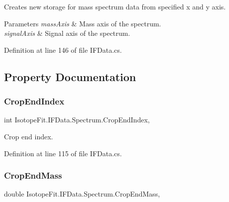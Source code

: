 Creates new storage for mass spectrum data from specified x and y axis. 


\begin{DoxyParams}{Parameters}
{\em mass\+Axis} & Mass axis of the spectrum.\\
\hline
{\em signal\+Axis} & Signal axis of the spectrum.\\
\hline
\end{DoxyParams}


Definition at line 146 of file I\+F\+Data.\+cs.



\subsection{Property Documentation}
\mbox{\label{class_isotope_fit_1_1_i_f_data_1_1_spectrum_a8b0c276faef24f22d7d535f74547bd7a}} 
\subsubsection{\texorpdfstring{Crop\+End\+Index}{CropEndIndex}}
{\footnotesize\ttfamily int Isotope\+Fit.\+I\+F\+Data.\+Spectrum.\+Crop\+End\+Index\hspace{0.3cm}{\ttfamily [get]}, {\ttfamily [set]}}



Crop end index. 



Definition at line 115 of file I\+F\+Data.\+cs.

\mbox{\label{class_isotope_fit_1_1_i_f_data_1_1_spectrum_a44767ce131c0a10c053e0d2aef07b2c8}} 
\subsubsection{\texorpdfstring{Crop\+End\+Mass}{CropEndMass}}
{\footnotesize\ttfamily double Isotope\+Fit.\+I\+F\+Data.\+Spectrum.\+Crop\+End\+Mass\hspace{0.3cm}{\ttfamily [get]}, {\ttfamily [set]}}



